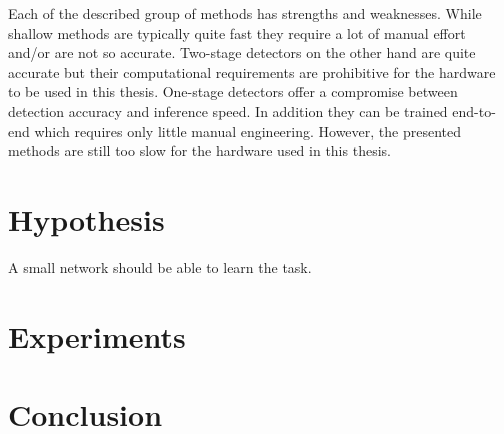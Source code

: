 Each of the described group of methods has strengths and weaknesses. While shallow methods are typically quite fast they require a lot of manual effort and/or are not so accurate. Two-stage detectors on the other hand are quite accurate but their computational requirements are prohibitive for the hardware to be used in this thesis. One-stage detectors offer a compromise between detection accuracy and inference speed. In addition they can be trained end-to-end which requires only little manual engineering. However, the presented methods are still too slow for the hardware used in this thesis.







\section{Hypothesis}

A small network should be able to learn the task.
\newpage
\section{Experiments}


\section{Conclusion}